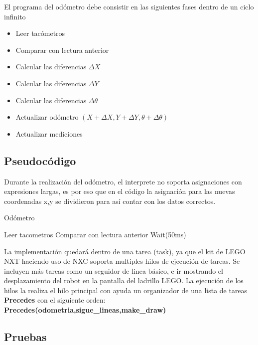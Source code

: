 \documentclass[oneside,onecolumn]{article}
\begin{document}
El programa del odómetro debe consistir en las siguientes fases dentro de un ciclo infinito

\begin{itemize}
\item Leer tacómetros
\item Comparar con lectura anterior
\item Calcular las diferencias $\Delta X$
\item Calcular las diferencias $\Delta Y$
\item Calcular las diferencias $\Delta \theta$
\item Actualizar odómetro $(X+\Delta X, Y+\Delta Y, \theta + \Delta \theta)$
\item Actualizar mediciones
\end{itemize}

\subsection{Pseudocódigo}

Durante la realización del odómetro, el interprete no soporta asignaciones con expresiones largas, es por eso que en el código la asignación para las nuevas coordenadas x,y se dividieron para así contar con los datos correctos.

\begin{algorithm}
  \caption{Odómetro}\label{alg:two}
  Leer tacometros\;
  Comparar con lectura anterior\;
  Wait(50ms)\;
\end{algorithm}

La implementación quedará dentro de una tarea (task), ya que el kit de LEGO NXT haciendo uso de NXC soporta multiples hilos de ejecución de tareas. Se incluyen más tareas como un seguidor de linea básico, e ir mostrando el desplazamiento del robot en la pantalla del ladrillo LEGO. La ejecución de los hilos la realiza el hilo principal con ayuda un organizador de una lista de tareas \textbf{Precedes} con el siguiente orden: \\
\textbf{Precedes(odometria,sigue\_lineas,make\_draw)\;} 

\subsection{Pruebas}
\end{document}
